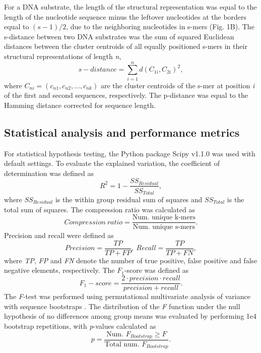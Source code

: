 \documentclass[sigconf]{acmart}
\begin{document}
For a DNA substrate, the length of the structural representation was equal to the length of the nucleotide sequence minus the leftover nucleotides at the borders equal to $(s-1)/2$, due to the neighboring nucleotides in s-mers (Fig. 1B). The s-distance between two DNA substrates was the sum of squared Euclidean distances between the cluster centroids of all equally positioned s-mers in their structural representations of length \textit{n},
\begin{equation}
  s-distance=\sum_{i=1}^{n}d(C_{1i}, C_{2i})^2,
\end{equation}
where \(C_{ni} = (c_{n1}, c_{n2},..., c_{nk})\) are the cluster centroids of the s-mer at position \textit{i} of the first and second sequences, respectively. The p-distance was equal to the Hamming distance corrected for sequence length.

\subsection{Statistical analysis and performance metrics}
For statistical hypothesis testing, the Python package Scipy v1.1.0 was used with default settings. To evaluate the explained variation, the coefficient of determination was defined as
\begin{equation}
R^2=1-\frac{SS_{Residual}}{SS_{Total}},
\end{equation}
where \(SS_{Residual}\) is the within group residual sum of squares and \(SS_{Total}\) is the total sum of squares. The compression ratio was calculated as
\begin{equation}
Compression\: ratio = \frac{\textrm{Num. unique k-mers}}{\textrm{Num. unique s-mers}}.
\end{equation}
Precision and recall were defined as 
\begin{equation}
Precision = \frac{TP}{TP+FP},\ Recall = \frac{TP}{TP+FN},
\end{equation}
where \textit{TP}, \textit{FP} and \textit{FN} denote the number of true positive, false positive and false negative elements, respectively. The $F_1$-score was defined as 
\begin{equation}
F_1-score = \frac{2\cdot precision\cdot recall}{precision+recall}.
\end{equation}
The \textit{F}-test was performed using permutational multivariate analysis of variance with sequence bootstraps \cite{Anderson2001-zz,Zrimec2018-lx}. The distribution of the \textit{F} function under the null hypothesis of no differences among group means was evaluated by performing 1e4 bootstrap repetitions, with \textit{p}-values calculated as
\begin{equation}
p = \frac{\textrm{Num. }F_{Bootstrap}\geq F}{\textrm{Total num. }F_{Bootstrap}}.
\end{equation}
\end{document}
